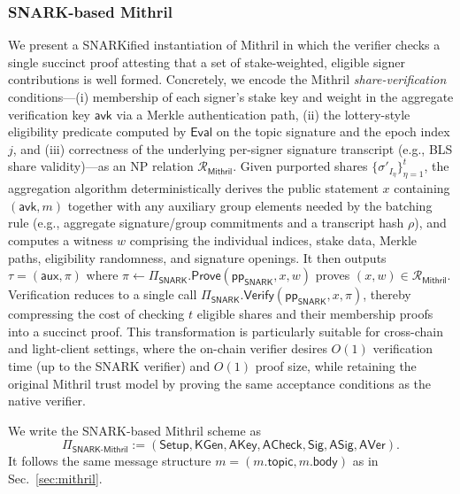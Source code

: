 \documentclass{article}
\newcommand{\pp}[0]{\mathsf{pp}}
\newcommand{\avk}[0]{\mathsf{avk}}
\newcommand{\topic}[0]{\mathsf{topic}}
\begin{document}
\subsubsection{SNARK-based Mithril}\label{sec:snark-mithril}

We present a SNARKified instantiation of Mithril in which the verifier checks a single succinct proof attesting that a set of stake-weighted, eligible signer contributions is well formed.
Concretely, we encode the Mithril \emph{share-verification} conditions---(i) membership of each signer’s stake key and weight in the aggregate verification key $\avk$ via a Merkle authentication path, (ii) the lottery-style eligibility predicate computed by $\mathsf{Eval}$ on the topic signature and the epoch index $j$, and (iii) correctness of the underlying per-signer signature transcript (e.g., BLS share validity)---as an NP relation $\mathcal{R}_{\mathsf{Mithril}}$.
Given purported shares $\{\sigma'_{I_\eta}\}_{\eta=1}^t$, the aggregation algorithm deterministically derives the public statement $x$ containing $(\avk,m)$ together with any auxiliary group elements needed by the batching rule (e.g., aggregate signature/group commitments and a transcript hash $\rho$), and computes a witness $w$ comprising the individual indices, stake data, Merkle paths, eligibility randomness, and signature openings.
It then outputs $\tau=(\textsf{aux},\pi)$ where $\pi\leftarrow\Pi_{\mathsf{SNARK}}.\mathsf{Prove}(\pp_{\mathsf{SNARK}},x,w)$ proves $(x,w)\in\mathcal{R}_{\mathsf{Mithril}}$.
Verification reduces to a single call $\Pi_{\mathsf{SNARK}}.\mathsf{Verify}(\pp_{\mathsf{SNARK}},x,\pi)$, thereby compressing the cost of checking $t$ eligible shares and their membership proofs into a succinct proof.
This transformation is particularly suitable for cross-chain and light-client settings, where the on-chain verifier desires $O(1)$ verification time (up to the SNARK verifier) and $O(1)$ proof size, while retaining the original Mithril trust model by proving the same acceptance conditions as the native verifier.


We write the SNARK-based Mithril scheme as
\[
  \Pi_{\mathsf{SNARK\text{-}Mithril}} := (\mathsf{Setup}, \mathsf{KGen}, \mathsf{AKey}, \mathsf{ACheck}, \mathsf{Sig}, \mathsf{ASig}, \mathsf{AVer}).
\]
It follows the same message structure $m=(m.\topic,m.\mathsf{body})$ as in Sec.~\ref{sec:mithril}.
\end{document}
